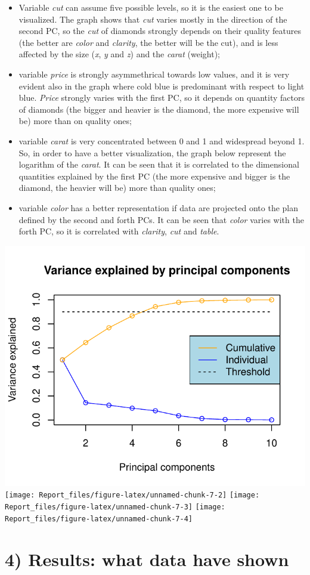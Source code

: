 \documentclass[
]{article}
\providecommand{\tightlist}{%
  \setlength{\itemsep}{0pt}\setlength{\parskip}{0pt}}
\begin{document}
\begin{itemize}
\tightlist
\item
  Variable \emph{cut} can assume five possible levels, so it is the
  easiest one to be visualized. The graph shows that \emph{cut} varies
  mostly in the direction of the second PC, so the \emph{cut} of
  diamonds strongly depends on their quality features (the better are
  \emph{color} and \emph{clarity}, the better will be the cut), and is
  less affected by the size (\emph{x}, \emph{y} and \emph{z}) and the
  \emph{carat} (weight);
\item
  variable \emph{price} is strongly asymmethrical towards low values,
  and it is very evident also in the graph where cold blue is
  predominant with respect to light blue. \emph{Price} strongly varies
  with the first PC, so it depends on quantity factors of diamonds (the
  bigger and heavier is the diamond, the more expensive will be) more
  than on quality ones;
\item
  variable \emph{carat} is very concentrated between 0 and 1 and
  widespread beyond 1. So, in order to have a better visualization, the
  graph below represent the logarithm of the \emph{carat}. It can be
  seen that it is correlated to the dimensional quantities explained by
  the first PC (the more expensive and bigger is the diamond, the
  heavier will be) more than quality ones;
\item
  variable \emph{color} has a better representation if data are
  projected onto the plan defined by the second and forth PCs. It can be
  seen that \emph{color} varies with the forth PC, so it is correlated
  with \emph{clarity}, \emph{cut} and \emph{table}.
\end{itemize}

\includegraphics[width=0.5\linewidth]{Report_files/figure-latex/unnamed-chunk-7-1}
\texttt{[image: Report\_files/figure-latex/unnamed-chunk-7-2]}
\texttt{[image: Report\_files/figure-latex/unnamed-chunk-7-3]}
\texttt{[image: Report\_files/figure-latex/unnamed-chunk-7-4]}

\section{4) Results: what data have
shown}\label{results-what-data-have-shown}
\end{document}
